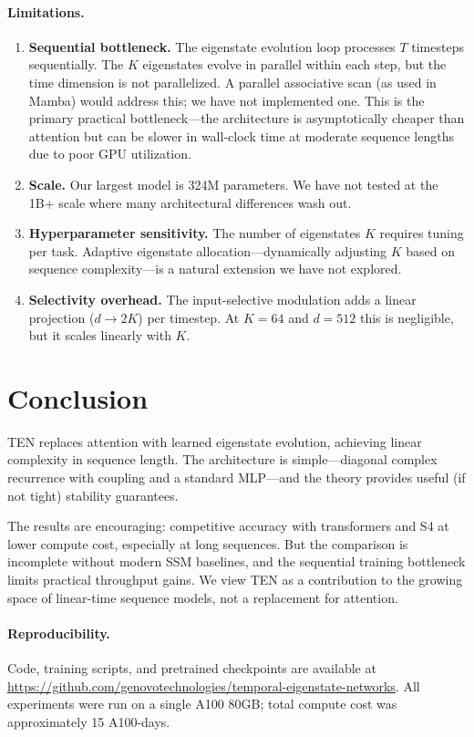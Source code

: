 \documentclass{article}
\begin{document}
\paragraph{Limitations.}
\begin{enumerate}[nosep]
\item \textbf{Sequential bottleneck.} The eigenstate evolution loop processes $T$ timesteps sequentially. The $K$ eigenstates evolve in parallel within each step, but the time dimension is not parallelized. A parallel associative scan (as used in Mamba) would address this; we have not implemented one. This is the primary practical bottleneck---the architecture is asymptotically cheaper than attention but can be slower in wall-clock time at moderate sequence lengths due to poor GPU utilization.
\item \textbf{Scale.} Our largest model is 324M parameters. We have not tested at the 1B+ scale where many architectural differences wash out.
\item \textbf{Hyperparameter sensitivity.} The number of eigenstates $K$ requires tuning per task. Adaptive eigenstate allocation---dynamically adjusting $K$ based on sequence complexity---is a natural extension we have not explored.
\item \textbf{Selectivity overhead.} The input-selective modulation adds a linear projection ($d \to 2K$) per timestep. At $K = 64$ and $d = 512$ this is negligible, but it scales linearly with $K$.
\end{enumerate}


\section{Conclusion}

TEN replaces attention with learned eigenstate evolution, achieving linear complexity in sequence length. The architecture is simple---diagonal complex recurrence with coupling and a standard MLP---and the theory provides useful (if not tight) stability guarantees.

The results are encouraging: competitive accuracy with transformers and S4 at lower compute cost, especially at long sequences. But the comparison is incomplete without modern SSM baselines, and the sequential training bottleneck limits practical throughput gains. We view TEN as a contribution to the growing space of linear-time sequence models, not a replacement for attention.

\paragraph{Reproducibility.} Code, training scripts, and pretrained checkpoints are available at \url{https://github.com/genovotechnologies/temporal-eigenstate-networks}. All experiments were run on a single A100 80GB; total compute cost was approximately 15 A100-days.
\end{document}
